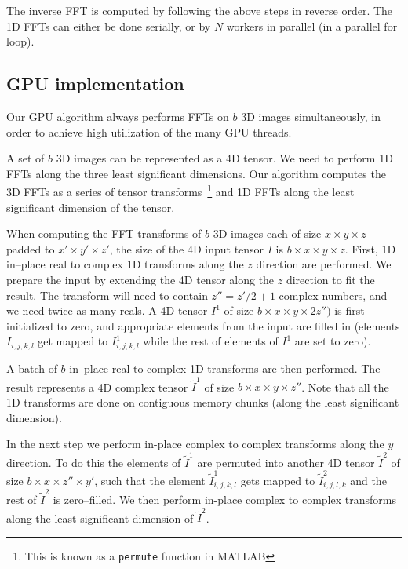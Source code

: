 \documentclass[conference]{./IEEEtran/IEEEtran}
\begin{document}
  The inverse FFT is computed by following the above steps in reverse
  order.  The 1D FFTs can either be done serially, or by $N$ workers
  in parallel (in a parallel for loop).


\subsection{GPU implementation}

\label{sec:gpu-fft-impl}

  Our GPU algorithm always performs FFTs on $b$ 3D images
  simultaneously, in order to achieve high utilization of the many
  GPU threads.

  A set of $b$ 3D images can be represented as a 4D tensor.  We need
  to perform 1D FFTs along the three least significant dimensions.
  Our algorithm computes the 3D FFTs as a series of tensor
  transforms~\footnote{This is known as a \texttt{permute} function in
    MATLAB} and 1D FFTs along the least significant dimension of the
  tensor.

  When computing the FFT transforms of $b$ 3D images each of size $x
  \times y \times z$ padded to $x' \times y' \times z'$, the size of
  the 4D input tensor $I$ is $b \times x \times y \times z$.  First,
  1D in--place real to complex 1D transforms along the $z$ direction
  are performed. We prepare the input by extending the 4D tensor along
  the $z$ direction to fit the result.  The transform will need to
  contain $z'' = z' / 2 + 1$ complex numbers, and we need twice as
  many reals.  A 4D tensor $I^1$ of size $b \times x \times y \times
  2z'')$ is first initialized to zero, and appropriate elements from
  the input are filled in (elements $I_{i,j,k,l}$ get mapped to
  $I^1_{i,j,k,l}$ while the rest of elements of $I^1$ are set to
  zero).

  A batch of $b$ in--place real to complex 1D transforms are then
  performed.  The result represents a 4D complex tensor
  $\widetilde{I}^1$ of size $b \times x \times y \times z''$.  Note
  that all the 1D transforms are done on contiguous memory chunks
  (along the least significant dimension).

  In the next step we perform in-place complex to complex transforms
  along the $y$ direction.  To do this the elements of
  $\widetilde{I}^1$ are permuted into another 4D tensor
  $\widetilde{I}^2$ of size $b \times x \times z'' \times y'$, such
  that the element $\widetilde{I}^1_{i,j,k,l}$ gets mapped to
  $\widetilde{I}^2_{i,j,l,k}$ and the rest of $\widetilde{I}^2$ is
  zero--filled.  We then perform in-place complex to complex
  transforms along the least significant dimension of
  $\widetilde{I}^2$.
\end{document}
